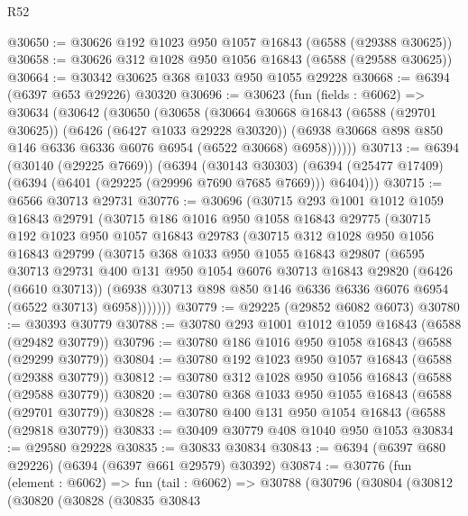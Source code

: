 \begin{lexlean}{R52}
\begin{coremodule}
@30650 := @30626 @192 @1023 @950 @1057 @16843 (@6588 (@29388 @30625))
@30658 := @30626 @312 @1028 @950 @1056 @16843 (@6588 (@29588 @30625))
@30664 := @30342 @30625 @368 @1033 @950 @1055 @29228
@30668 := @6394 (@6397 @653 @29226) @30320
@30696 := @30623
    (fun (fields : @6062) =>
    @30634
      (@30642
        (@30650
          (@30658
            (@30664
              @30668
              @16843
              (@6588 (@29701 @30625))
              (@6426 (@6427 @1033 @29228 @30320))
              (@6938 @30668 @898 @850 @146 @6336 @6336 @6076 @6954 (@6522 @30668) @6958))))))
@30713 := @6394
    (@30140 (@29225 @7669))
    (@6394
      (@30143 @30303)
      (@6394 (@25477 @17409) (@6394 (@6401 (@29225 (@29996 @7690 @7685 @7669))) @6404)))
@30715 := @6566 @30713 @29731
@30776 := @30696
    (@30715
      @293
      @1001
      @1012
      @1059
      @16843
      @29791
      (@30715
        @186
        @1016
        @950
        @1058
        @16843
        @29775
        (@30715
          @192
          @1023
          @950
          @1057
          @16843
          @29783
          (@30715
            @312
            @1028
            @950
            @1056
            @16843
            @29799
            (@30715
              @368
              @1033
              @950
              @1055
              @16843
              @29807
              (@6595
                @30713
                @29731
                @400
                @131
                @950
                @1054
                @6076
                @30713
                @16843
                @29820
                (@6426 (@6610 @30713))
                (@6938 @30713 @898 @850 @146 @6336 @6336 @6076 @6954 (@6522 @30713) @6958)))))))
@30779 := @29225 (@29852 @6082 @6073)
@30780 := @30393 @30779
@30788 := @30780 @293 @1001 @1012 @1059 @16843 (@6588 (@29482 @30779))
@30796 := @30780 @186 @1016 @950 @1058 @16843 (@6588 (@29299 @30779))
@30804 := @30780 @192 @1023 @950 @1057 @16843 (@6588 (@29388 @30779))
@30812 := @30780 @312 @1028 @950 @1056 @16843 (@6588 (@29588 @30779))
@30820 := @30780 @368 @1033 @950 @1055 @16843 (@6588 (@29701 @30779))
@30828 := @30780 @400 @131 @950 @1054 @16843 (@6588 (@29818 @30779))
@30833 := @30409 @30779 @408 @1040 @950 @1053
@30834 := @29580 @29228
@30835 := @30833 @30834
@30843 := @6394 (@6397 @680 @29226) (@6394 (@6397 @661 @29579) @30392)
@30874 := @30776
    (fun (element : @6062) =>
    fun (tail : @6062) =>
    @30788
      (@30796
        (@30804
          (@30812
            (@30820
              (@30828
                (@30835
                  @30843

\end{coremodule}
\end{lexlean}
